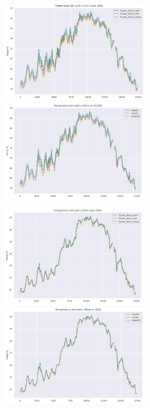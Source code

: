 \documentclass[letterpaper,12pt]{article}
\begin{document}
\begin{center}
	\includegraphics[height=5cm]{T20.png}\hspace*{\fill}
	\label{graf7}
   \includegraphics[height=5cm]{T20roll.png}
    \label{graf8}
\end{center}

\begin{center}
	\includegraphics[height=5cm]{T40.png}\hspace*{\fill}
	\label{graf9}
   \includegraphics[height=5cm]{T40roll.png}
    \label{graf10}
\end{center}
\end{document}
